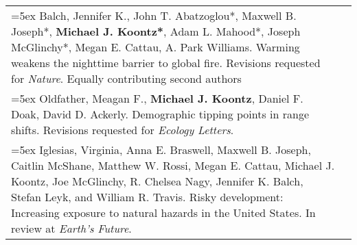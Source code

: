 \begin{longtable}{@{} >{\raggedright}p{5.25in} >{\raggedleft}X @{}}
\hangindent=5ex Balch, Jennifer K., John T. Abatzoglou*, Maxwell B. Joseph*, \textbf{Michael J. Koontz*}, Adam L. Mahood*, Joseph McGlinchy*, Megan E. Cattau, A. Park Williams. Warming weakens the nighttime barrier to global fire. Revisions requested for \emph{Nature}. 
\newline *Equally contributing second authors & 2020 \tabularnewline

\hangindent=5ex Oldfather, Meagan F., \textbf{Michael J. Koontz}, Daniel F. Doak, David D. Ackerly. Demographic tipping points in range shifts. Revisions requested for \emph{Ecology Letters}. & 2020 \tabularnewline

\hangindent=5ex Iglesias, Virginia, Anna E. Braswell, Maxwell B. Joseph, Caitlin McShane, Matthew W. Rossi, Megan E. Cattau, Michael J. Koontz, Joe McGlinchy, R. Chelsea Nagy, Jennifer K. Balch, Stefan Leyk, and William R. Travis. Risky development: Increasing exposure to natural hazards in the United States. In review at \emph{Earth's Future}. & 2020 \tabularnewline


\end{longtable}
